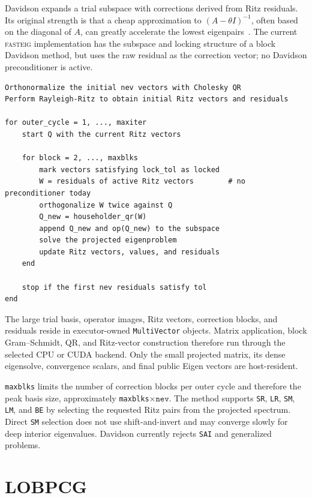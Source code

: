 \documentclass[11pt]{article}
\newcommand{\fasteig}{\textsc{fasteig}}
\newcommand{\code}[1]{\texttt{#1}}
\begin{document}
Davidson expands a trial subspace with corrections derived from Ritz
residuals.  Its original strength is that a cheap approximation to
$(A-\theta I)^{-1}$, often based on the diagonal of $A$, can greatly accelerate
the lowest eigenpairs~\cite{davidson}.  The current \fasteig{} implementation
has the subspace and locking structure of a block Davidson method, but uses the
raw residual as the correction vector; no Davidson preconditioner is active.

\begin{lstlisting}
Orthonormalize the initial nev vectors with Cholesky QR
Perform Rayleigh-Ritz to obtain initial Ritz vectors and residuals

for outer_cycle = 1, ..., maxiter
    start Q with the current Ritz vectors

    for block = 2, ..., maxblks
        mark vectors satisfying lock_tol as locked
        W = residuals of active Ritz vectors        # no preconditioner today
        orthogonalize W twice against Q
        Q_new = householder_qr(W)
        append Q_new and op(Q_new) to the subspace
        solve the projected eigenproblem
        update Ritz vectors, values, and residuals
    end

    stop if the first nev residuals satisfy tol
end
\end{lstlisting}

The large trial basis, operator images, Ritz vectors, correction blocks, and
residuals reside in executor-owned \code{MultiVector} objects.  Matrix
application, block Gram--Schmidt, QR, and Ritz-vector construction therefore
run through the selected CPU or CUDA backend.  Only the small projected matrix,
its dense eigensolve, convergence scalars, and final public Eigen vectors are
host-resident.

\code{maxblks} limits the number of correction blocks per outer cycle and
therefore the peak basis size, approximately \code{maxblks}$\times\code{nev}$.
The method supports \code{SR}, \code{LR}, \code{SM}, \code{LM}, and \code{BE}
by selecting the requested Ritz pairs from the projected spectrum.  Direct
\code{SM} selection does not use shift-and-invert and may converge slowly for
deep interior eigenvalues.  Davidson currently rejects \code{SAI} and
generalized problems.

\section{LOBPCG}
\label{sec:lobpcg}
\end{document}
